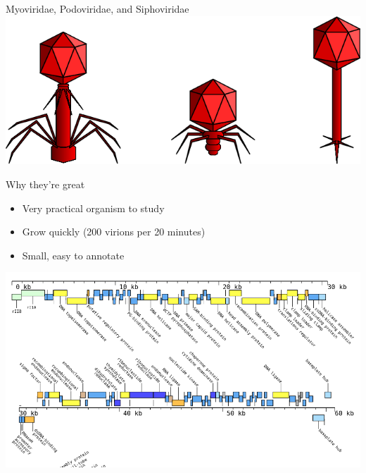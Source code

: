 \documentclass[12pt]{beamer}
\begin{document}
\begin{frame}{Myoviridae, Podoviridae, and Siphoviridae}
    \centering
    \includegraphics[width=\textwidth]{./Caudovirales.png}
\end{frame}

\begin{frame}{Why they're great}
    \begin{itemize}
        \item Very practical organism to study
        \item Grow quickly (200 virions per 20 minutes)
        \item Small, easy to annotate
    \end{itemize}
    \centering
    \includegraphics[height=.5\textheight]{./annotation.png}
\end{frame}
\end{document}
